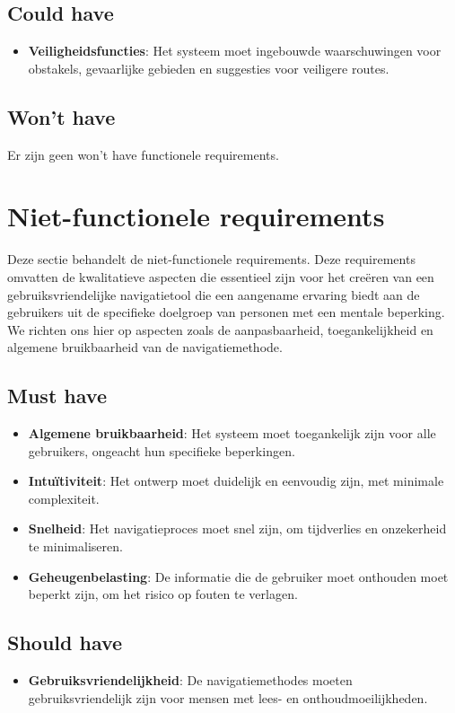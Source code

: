 \subsection*{Could have}
\begin{itemize}
    \item \textbf{Veiligheidsfuncties}: Het systeem moet ingebouwde waarschuwingen voor obstakels, gevaarlijke gebieden en suggesties voor veiligere routes.
\end{itemize}

\subsection*{Won't have}
Er zijn geen won't have functionele requirements.


\section{Niet-functionele requirements}
\label{sec:niet-functionele-requirements}

Deze sectie behandelt de niet-functionele requirements. Deze requirements omvatten de kwalitatieve aspecten die essentieel zijn voor het creëren van een gebruiksvriendelijke navigatietool die een aangename ervaring biedt aan de gebruikers uit de specifieke doelgroep van personen met een mentale beperking. We richten ons hier op aspecten zoals de aanpasbaarheid, toegankelijkheid en algemene bruikbaarheid van de navigatiemethode.

\subsection*{Must have}
\begin{itemize}
    \item \textbf{Algemene bruikbaarheid}: Het systeem moet toegankelijk zijn voor alle gebruikers, ongeacht hun specifieke beperkingen.
    \item \textbf{Intuïtiviteit}: Het ontwerp moet duidelijk en eenvoudig zijn, met minimale complexiteit.
    \item \textbf{Snelheid}: Het navigatieproces moet snel zijn, om tijdverlies en onzekerheid te minimaliseren.
    \item \textbf{Geheugenbelasting}: De informatie die de gebruiker moet onthouden moet beperkt zijn, om het risico op fouten te verlagen.
\end{itemize}

\subsection*{Should have}
\begin{itemize}
    \item \textbf{Gebruiksvriendelijkheid}: De navigatiemethodes moeten gebruiksvriendelijk zijn voor mensen met lees- en onthoudmoeilijkheden.
\end{itemize}

